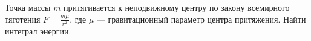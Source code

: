 Точка массы $m$ притягивается к неподвижному центру по закону всемирного
тяготения $F=\frac{m\mu}{r^2}$, где $\mu$ --- гравитационный параметр
центра притяжения. Найти интеграл энергии.
